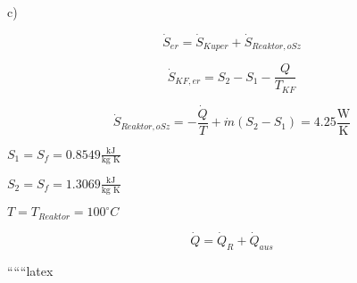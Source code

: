 c)

\[
\dot{S}_{er} = \dot{S}_{Kuper} + \dot{S}_{Reaktor, oSz}
\]

\[
\dot{S}_{KF, er} = S_2 - S_1 - \frac{Q}{T_{KF}}
\]

\[
\dot{S}_{Reaktor, oSz} = -\frac{\dot{Q}}{T} + \dot{m} (S_2 - S_1) = 4.25 \frac{\text{W}}{\text{K}}
\]

$S_1 = S_f = 0.8549 \frac{\text{kJ}}{\text{kg K}}$

$S_2 = S_f = 1.3069 \frac{\text{kJ}}{\text{kg K}}$

$T = T_{Reaktor} = 100^\circ C$

\[
\dot{Q} = \dot{Q}_R + \dot{Q}_{aus}
\]

``````latex